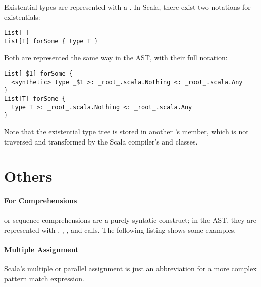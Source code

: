 \noindent Existential types are represented with a . In Scala, there exist two notations for existentials:

\begin{lstlisting}
List[_]
List[T] forSome { type T }
\end{lstlisting}

Both are represented the same way in the AST, with their full notation:

\begin{lstlisting}
List[_$1] forSome { 
  <synthetic> type _$1 >: _root_.scala.Nothing <: _root_.scala.Any
}
List[T] forSome { 
  type T >: _root_.scala.Nothing <: _root_.scala.Any
}
\end{lstlisting}

Note that the existential type tree is stored in another 's  member, which is not traversed and transformed by the Scala compiler's  and  classes.

\section{Others}

\paragraph{For Comprehensions}

\noindent {} or sequence comprehensions are a purely syntatic construct; in the AST, they are represented with , , , and  calls. The following listing shows some examples. 

\paragraph{Multiple Assignment}

\noindent Scala's multiple or parallel assignment is just an abbreviation for a more complex pattern match expression.





